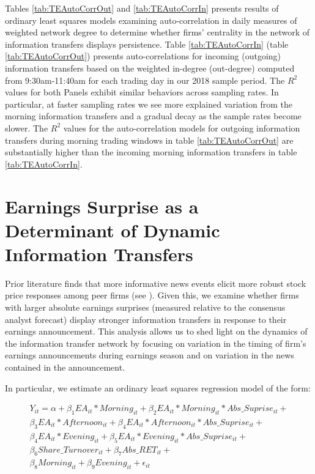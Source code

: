 Tables \ref{tab:TEAutoCorrOut} and \ref{tab:TEAutoCorrIn} presents results of ordinary least squares models examining auto-correlation in daily measures of weighted network degree to determine whether firms’ centrality in the network of information transfers displays persistence.  Table \ref{tab:TEAutoCorrIn} (table \ref{tab:TEAutoCorrOut}) presents auto-correlations for incoming (outgoing) information transfers based on the weighted in-degree (out-degree) computed from 9:30am-11:40am for each trading day in our 2018 sample period.  The $R^2$ values for both Panels exhibit similar behaviors across sampling rates. In particular, at faster sampling rates we see more explained variation from the morning information transfers and a gradual decay as the sample rates become slower. The $R^2$ values for the auto-correlation models for outgoing information transfers during morning trading windows in table \ref{tab:TEAutoCorrOut} are substantially higher than the incoming morning information transfers in table \ref{tab:TEAutoCorrIn}. 


\section{Earnings Surprise as a Determinant of Dynamic Information Transfers} %

Prior literature finds that more informative news events elicit more robust stock price responses among peer firms (see \cite{Foster1981,  Brochet2018}).  Given this,  we examine whether firms with larger absolute earnings surprises (measured relative to the consensus analyst forecast) display stronger information transfers in response to their earnings announcement.  This analysis allows us to shed light on the dynamics of the information transfer network by focusing on variation in the timing of firm’s earnings announcements during earnings season and on variation in the news contained in the announcement.  

In particular,  we estimate an ordinary least squares regression model of the form:

\setlength{\arraycolsep}{0.0em}
\begin{eqnarray}
Y_{it} = \alpha + \beta_1 EA_{it}  * Morning_{it} + \beta_2 EA_{it}  * Morning_{it} * Abs\_Suprise_{it} + \nonumber\\
\beta_3 EA_{it}  * Afternoon_{it} + \beta_4 EA_{it}  * Afternoon_{it} * Abs\_Suprise_{it} + \nonumber\\
\beta_4 EA_{it}  * Evening_{it} + \beta_5 EA_{it}  * Evening_{it} * Abs\_Suprise_{it} + \nonumber\\
\beta_6 Share\_Turnover_{it} + \beta_7 Abs\_RET_{it} + \nonumber\\
\beta_8 Morning_{it} + \beta_9 Evening_{it} +  \epsilon_{it}
\label{eq:EA-Surprise}
\end{eqnarray}
\setlength{\arraycolsep}{1pt}

